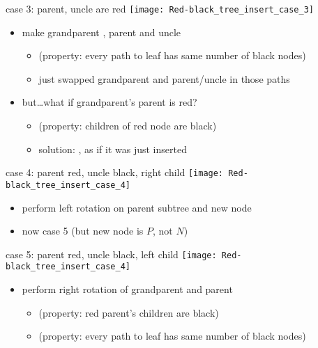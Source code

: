 \begin{frame}{case 3: parent, uncle are red}
\texttt{[image: Red-black\_tree\_insert\_case\_3]}
\begin{itemize}
\item make grandparent , parent and uncle 
    \begin{itemize}
    \item (property: every path to leaf has same number of black nodes)
    \item just swapped grandparent and parent/uncle in those paths
    \end{itemize}
\item<2-> but\ldots what if grandparent's parent is red?
    \begin{itemize}
    \item (property: children of red node are black)
    \item solution: , as if it was just inserted
    \end{itemize}
\end{itemize}
\end{frame}


\begin{frame}{case 4: parent red, uncle black, right child}
\texttt{[image: Red-black\_tree\_insert\_case\_4]}
\begin{itemize}
\item perform left rotation on parent subtree and new node
\item now case 5 (but new node is $P$, not $N$)
\end{itemize}
\end{frame}


\begin{frame}{case 5: parent red, uncle black, left child}
\texttt{[image: Red-black\_tree\_insert\_case\_4]}
\begin{itemize}
\item perform right rotation of grandparent and parent
\begin{itemize}
    \item (property: red parent's children are black)
    \item (property: every path to leaf has same number of black nodes)
\end{itemize}
\end{itemize}
\end{frame}
